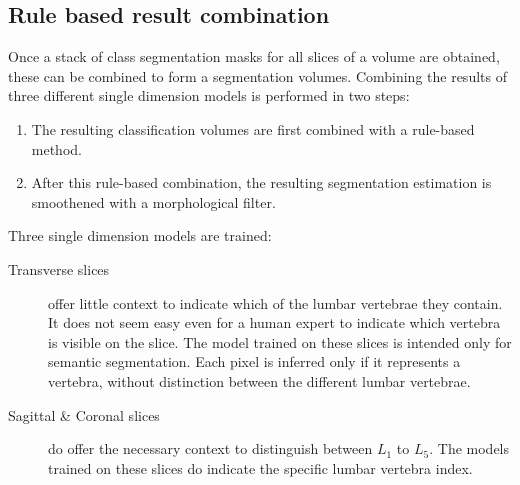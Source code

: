 \subsection{Rule based result combination}
Once a stack of class segmentation masks for all slices of a volume are obtained, these can be combined to form a segmentation volumes.
Combining the results of three different single dimension models is performed in two steps:
\begin{enumerate}
    \item The resulting classification volumes are first combined with a rule-based method.
    \item After this rule-based combination, the resulting segmentation estimation is smoothened with a morphological filter.
\end{enumerate}

Three single dimension models are trained:
\begin{description}
    \item[Transverse slices] offer little context to indicate which of the lumbar vertebrae they contain. 
    It does not seem easy even for a human expert to indicate which vertebra is visible on the slice.
    The model trained on these slices is intended only for semantic segmentation.
    Each pixel is inferred only if it represents a vertebra, without distinction between the different lumbar vertebrae. 
    \item[Sagittal \& Coronal slices] do offer the necessary context to distinguish between $L_1$ to $L_5$. 
    The models trained on these slices do indicate the specific lumbar vertebra index. 
\end{description}

